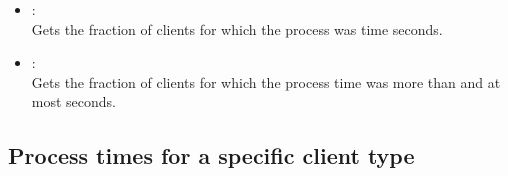 \begin{itemize}
\item
{}:\\
Gets the fraction of clients for which the process  was time seconds.

\item
{}:\\
Gets the fraction of clients for which the process time was more than  and at most  seconds.

\end{itemize}



\subsection{Process times for a specific client type}

